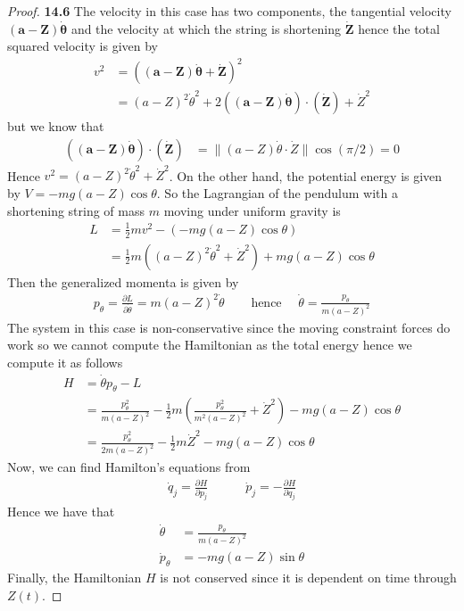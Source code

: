 \documentclass[11pt]{article}
\theoremstyle{definition}
\begin{document}
\cleardoublepage
\begin{proof}{\textbf{14.6}}
    The velocity in this case has two components, the tangential velocity
    $\bm{(a - Z)\dot\theta}$ and the velocity at which the string is shortening
    $\bm{\dot Z}$ hence the total squared velocity is given by
    \begin{align*}
        v^2 &= (\bm{(a - Z)\dot\theta} + \bm{\dot Z})^2\\
        &= (a - Z)^2\dot\theta^2
        + 2(\bm{(a - Z)\dot\theta})\cdot(\bm{\dot Z}) + \dot Z^2
    \end{align*} 
    but we know that
    \begin{align*}
        (\bm{(a - Z)\dot\theta})\cdot(\bm{\dot Z})
        &= \|(a - Z)\dot\theta \cdot \dot Z\| \cos (\pi/2) = 0         
    \end{align*}
    Hence $v^2 =(a - Z)^2\dot\theta^2 + \dot Z^2$.
    On the other hand, the potential energy is given by
    $V = -mg(a - Z)\cos\theta$.
    So the Lagrangian of the pendulum with a shortening string of mass $m$
    moving under uniform gravity is
    \begin{align*}
        L &= \frac{1}{2}mv^2 - (-mg(a - Z)\cos\theta)\\
        &= \frac{1}{2}m((a - Z)^2\dot\theta^2 + \dot Z^2)
        + mg(a - Z)\cos\theta
    \end{align*}
    Then the generalized momenta is given by
    \begin{align*}
        p_\theta = \frac{\partial L}{\partial \dot{\theta}}
        = m(a - Z)^2\dot\theta
        \quad&\text{ hence }\quad \dot \theta = \frac{p_\theta}{m(a - Z)^2}
    \end{align*}
    The system in this case is non-conservative since the moving constraint
    forces do work so we cannot compute the
    Hamiltonian as the total energy hence we compute it as follows 
    \begin{align*}
        H &= \dot\theta p_\theta - L\\
        &= \frac{p_\theta^2}{m(a - Z)^2} -
        \frac{1}{2}m\left(\frac{p_\theta^2}{m^2(a - Z)^2} + \dot Z^2 \right)
        - mg(a - Z)\cos\theta\\
        &=\frac{p_\theta^2}{2m(a - Z)^2} -
        \frac{1}{2}m\dot Z^2
        - mg(a - Z)\cos\theta
    \end{align*}
    Now, we can find Hamilton's equations from
    \begin{align*}
        \dot{q}_j = \frac{\partial H}{\partial p_j} \quad\quad\quad
        \dot{p}_j = -\frac{\partial H}{\partial q_j}
    \end{align*}
    Hence we have that
    \begin{align*}
        \dot \theta &= \frac{p_\theta}{m(a-Z)^2} \\
        \dot p_\theta
        &= - mg(a - Z)\sin\theta 
    \end{align*}
    Finally, the Hamiltonian $H$ is not conserved since it is dependent on time
    through $Z(t)$. 
\end{proof}
\end{document}
